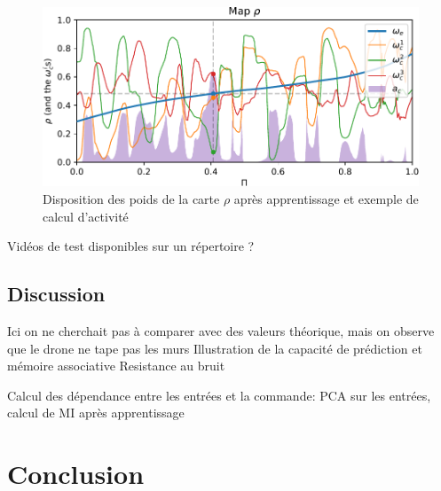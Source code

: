 \begin{figure}
\includegraphics[width=\textwidth]{dronemap}
\caption{Disposition des poids de la carte $\rho$ après apprentissage et exemple de calcul d'activité}
\end{figure}

Vidéos de test disponibles sur un répertoire ?

\subsection{Discussion}
Ici on ne cherchait pas à comparer avec des valeurs théorique, mais on observe que le drone ne tape pas les murs
Illustration de la capacité de prédiction et mémoire associative
Resistance au bruit

Calcul des dépendance entre les entrées et la commande:
PCA sur les entrées, calcul de MI après apprentissage
\section{Conclusion}





